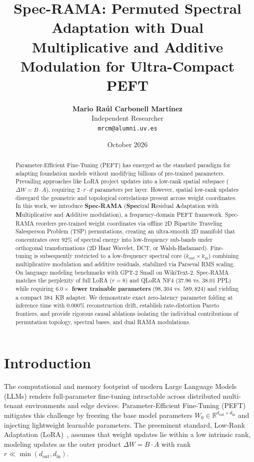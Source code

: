 \documentclass{article}
\title{\textbf{Spec-RAMA: Permuted Spectral Adaptation with Dual Multiplicative and Additive Modulation for Ultra-Compact PEFT}}
\author{
  \textbf{Mario Raúl Carbonell Martínez} \\
  Independent Researcher \\
  \texttt{mrcm@alumni.uv.es}
}
\date{October 2026}
\begin{document}
\maketitle

\begin{abstract}
Parameter-Efficient Fine-Tuning (PEFT) has emerged as the standard paradigm for adapting foundation models without modifying billions of pre-trained parameters. Prevailing approaches like LoRA project updates into a low-rank spatial subspace ($\Delta W = B \cdot A$), requiring $2 \cdot r \cdot d$ parameters per layer. However, spatial low-rank updates disregard the geometric and topological correlations present across weight coordinates. In this work, we introduce \textbf{Spec-RAMA} (\textbf{Spec}tral \textbf{R}esidual \textbf{A}daptation with \textbf{M}ultiplicative and \textbf{A}dditive modulation), a frequency-domain PEFT framework. Spec-RAMA reorders pre-trained weight coordinates via offline 2D Bipartite Traveling Salesperson Problem (TSP) permutations, creating an ultra-smooth 2D manifold that concentrates over $92\%$ of spectral energy into low-frequency sub-bands under orthogonal transformations (2D Haar Wavelet, DCT, or Walsh-Hadamard). Fine-tuning is subsequently restricted to a low-frequency spectral core ($k_{\text{out}} \times k_{\text{in}}$) combining multiplicative modulation and additive residuals, stabilized via Parseval RMS scaling. On language modeling benchmarks with GPT-2 Small on WikiText-2, Spec-RAMA matches the perplexity of full LoRA ($r=8$) and QLoRA NF4 ($37.96$ vs. $38.01$ PPL) while requiring \textbf{$6.0\times$ fewer trainable parameters} ($98,304$ vs. $589,824$) and yielding a compact $384$~KB adapter. We demonstrate exact zero-latency parameter folding at inference time with $0.000\%$ reconstruction drift, establish rate-distortion Pareto frontiers, and provide rigorous causal ablations isolating the individual contributions of permutation topology, spectral bases, and dual RAMA modulations.
\end{abstract}

\section{Introduction}

The computational and memory footprint of modern Large Language Models (LLMs) renders full-parameter fine-tuning intractable across distributed multi-tenant environments and edge devices. Parameter-Efficient Fine-Tuning (PEFT) mitigates this challenge by freezing the base model parameters $W_0 \in \mathbb{R}^{d_{\text{out}} \times d_{\text{in}}}$ and injecting lightweight learnable parameters. The preeminent standard, Low-Rank Adaptation (LoRA)~\cite{hu2022lora}, assumes that weight updates lie within a low intrinsic rank, modeling updates as the outer product $\Delta W = B \cdot A$ with rank $r \ll \min(d_{\text{out}}, d_{\text{in}})$. 
\end{document}
